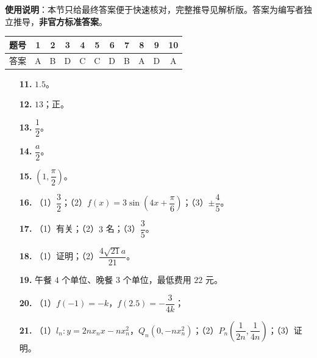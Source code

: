 
\begin{gknotice}
\textbf{使用说明}：本节只给最终答案便于快速核对，完整推导见解析版。答案为编写者独立推导，\textbf{非官方标准答案}。
\end{gknotice}

\begin{center}\begin{tabular}{ccccccccccc}
\toprule
题号 & 1 & 2 & 3 & 4 & 5 & 6 & 7 & 8 & 9 & 10 \\
\midrule
答案 & A & B & D & C & C & D & B & A & D & A \\
\bottomrule
\end{tabular}\end{center}

\begin{itemize}[leftmargin=2.6em]
  \item[\textbf{11.}] $1.5$。
  \item[\textbf{12.}] $13$；正。
  \item[\textbf{13.}] $\dfrac12$。
  \item[\textbf{14.}] $\dfrac a2$。
  \item[\textbf{15.}] $\left(1,\dfrac\pi2\right)$。
\end{itemize}

\begin{itemize}[leftmargin=2.6em]
  \item[\textbf{16.}] （1）$\dfrac32$；（2）$f(x)=3\sin\left(4x+\dfrac\pi6\right)$；（3）$\pm\dfrac45$。
  \item[\textbf{17.}] （1）有关；（2）$3$ 名；（3）$\dfrac35$。
  \item[\textbf{18.}] （1）证明；（2）$\dfrac{4\sqrt{21}a}{21}$。
  \item[\textbf{19.}] 午餐 $4$ 个单位、晚餐 $3$ 个单位，最低费用 $22$ 元。
  \item[\textbf{20.}] （1）$f(-1)=-k$，$f(2.5)=-\dfrac3{4k}$；
  \item[\textbf{21.}] （1）$l_n:y=2nx_nx-nx_n^2$，$Q_n(0,-nx_n^2)$；（2）$P_n\left(\dfrac1{2n},\dfrac1{4n}\right)$；（3）证明。
\end{itemize}
